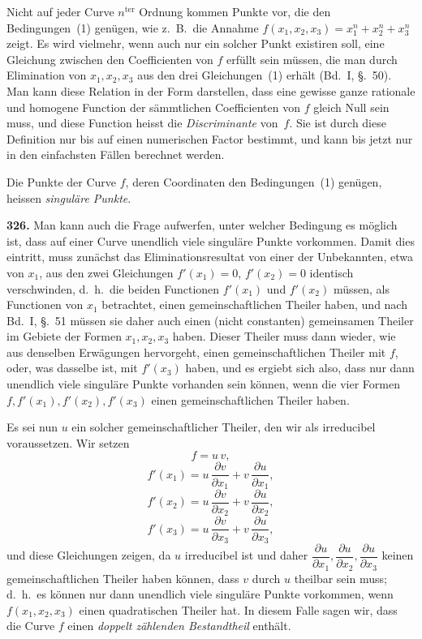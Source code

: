 \documentclass[12pt,a4paper]{article}
\begin{document}
Nicht auf jeder Curve $n^{\text{ter}}$ Ordnung kommen Punkte vor, die den Bedingungen~(1) gen\"ugen, wie z.~B.\ die Annahme $f(x_1,x_2,x_3) = x_1^n + x_2^n + x_3^n$ zeigt. Es wird vielmehr, wenn auch nur ein solcher Punkt existiren soll, eine Gleichung zwischen den Coefficienten von $f$ erf\"ullt sein m\"ussen, die man durch Elimination von $x_1,x_2,x_3$ aus den drei Gleichungen~(1) erh\"alt (Bd.~I, \S.~50). Man kann diese Relation in der Form darstellen, dass eine gewisse ganze rationale und homogene Function der s\"ammtlichen Coefficienten von $f$ gleich Null sein muss, und diese Function heisst die \emph{Discriminante} von~$f$. Sie ist durch diese Definition nur bis auf einen numerischen Factor bestimmt, und kann bis jetzt nur in den einfachsten F\"allen berechnet werden.

Die Punkte der Curve $f$, deren Coordinaten den Bedingungen~(1) gen\"ugen, heissen \emph{singul\"are Punkte}.

\bigskip
\noindent\textbf{326.} Man kann auch die Frage aufwerfen, unter welcher Bedingung es m\"oglich ist, dass auf einer Curve unendlich viele singul\"are Punkte vorkommen. Damit dies eintritt, muss zun\"achst das Eliminationsresultat von einer der Unbekannten, etwa von $x_1$, aus den zwei Gleichungen $f'(x_1)=0$, $f'(x_2)=0$ identisch verschwinden, d.~h.\ die beiden Functionen $f'(x_1)$ und $f'(x_2)$ m\"ussen, als Functionen von $x_1$ betrachtet, einen gemeinschaftlichen Theiler haben, und nach Bd.~I, \S.~51 m\"ussen sie daher auch einen (nicht constanten) gemeinsamen Theiler im Gebiete der Formen $x_1,x_2,x_3$ haben. Dieser Theiler muss dann wieder, wie aus denselben Erw\"agungen hervorgeht, einen gemeinschaftlichen Theiler mit $f$, oder, was dasselbe ist, mit $f'(x_3)$ haben, und es ergiebt sich also, dass nur dann unendlich viele singul\"are Punkte vorhanden sein k\"onnen, wenn die vier Formen $f, f'(x_1), f'(x_2), f'(x_3)$ einen gemeinschaftlichen Theiler haben.

Es sei nun $u$ ein solcher gemeinschaftlicher Theiler, den wir als irreducibel voraussetzen. Wir setzen
\[
f = u\,v,
\]
\[
f'(x_1) = u\,\frac{\partial v}{\partial x_1} + v\,\frac{\partial u}{\partial x_1},
\]
\[
f'(x_2) = u\,\frac{\partial v}{\partial x_2} + v\,\frac{\partial u}{\partial x_2},
\]
\[
f'(x_3) = u\,\frac{\partial v}{\partial x_3} + v\,\frac{\partial u}{\partial x_3},
\]
und diese Gleichungen zeigen, da $u$ irreducibel ist und daher $\dfrac{\partial u}{\partial x_1},\dfrac{\partial u}{\partial x_2},\dfrac{\partial u}{\partial x_3}$ keinen gemeinschaftlichen Theiler haben k\"onnen, dass $v$ durch $u$ theilbar sein muss; d.~h.\ es k\"onnen nur dann unendlich viele singul\"are Punkte vorkommen, wenn $f(x_1,x_2,x_3)$ einen quadratischen Theiler hat. In diesem Falle sagen wir, dass die Curve $f$ einen \emph{doppelt z\"ahlenden Bestandtheil} enth\"alt.
\end{document}
